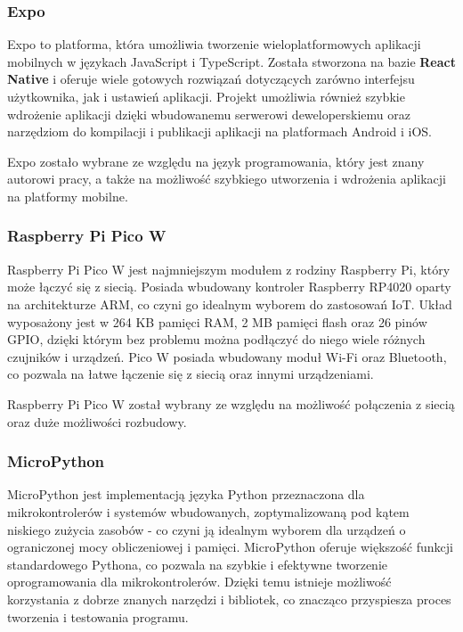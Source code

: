 \subsubsection*{Expo}

Expo to platforma, która umożliwia tworzenie wieloplatformowych aplikacji mobilnych w językach JavaScript i TypeScript. Została stworzona na bazie {\bfseries React Native} i oferuje wiele gotowych rozwiązań dotyczących zarówno interfejsu użytkownika, jak i ustawień aplikacji. Projekt umożliwia również szybkie wdrożenie aplikacji dzięki wbudowanemu serwerowi deweloperskiemu oraz narzędziom do kompilacji i publikacji aplikacji na platformach Android i iOS. \cite{bib:expo}

Expo zostało wybrane ze względu na język programowania, który jest znany autorowi pracy, a także na możliwość szybkiego utworzenia i wdrożenia aplikacji na platformy mobilne.

\subsubsection*{Raspberry Pi Pico W}

Raspberry Pi Pico W jest najmniejszym modułem z rodziny Raspberry Pi, który może łączyć się z siecią. Posiada wbudowany kontroler Raspberry RP4020 oparty na architekturze ARM, co czyni go idealnym wyborem do zastosowań IoT. Układ wyposażony jest w 264 KB pamięci RAM, 2 MB pamięci flash oraz 26 pinów GPIO, dzięki którym bez problemu można podłączyć do niego wiele różnych czujników i urządzeń. Pico W posiada wbudowany moduł Wi-Fi oraz Bluetooth, co pozwala na łatwe łączenie się z siecią oraz innymi urządzeniami.

Raspberry Pi Pico W został wybrany ze względu na możliwość połączenia z siecią oraz duże możliwości rozbudowy. \cite{bib:picoW}

\subsubsection*{MicroPython}

MicroPython jest implementacją języka Python przeznaczona dla mikrokontrolerów i systemów wbudowanych, zoptymalizowaną pod kątem niskiego zużycia zasobów - co czyni ją idealnym wyborem dla urządzeń o ograniczonej mocy obliczeniowej i pamięci. MicroPython oferuje większość funkcji standardowego Pythona, co pozwala na szybkie i efektywne tworzenie oprogramowania dla mikrokontrolerów. Dzięki temu istnieje możliwość korzystania z dobrze znanych narzędzi i bibliotek, co znacząco przyspiesza proces tworzenia i testowania programu. \cite{bib:micropython}

